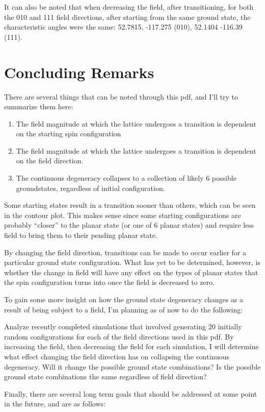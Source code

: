 \documentclass{article}
\begin{document}
\par It can also be noted that when decreasing the field, after transitioning, for both the 
010 and 111 field directions, after starting from the same ground state, the characteristic angles were the same: 52.7815, -117.275 (010), 52.1404 -116.39 (111).
\section{Concluding Remarks}
There are several things that can be noted through this pdf, and I'll try to summarize them here:
\begin{enumerate}
 \item The field magnitude at which the lattice undergoes a transition is dependent on the starting spin configuration
 \item The field magnitude at which the lattice undergoes a transition is dependent on the field direction.
 \item The continuous degeneracy collapses to a collection of likely 6 possible groundstates, regardless of initial configuration.
\end{enumerate}
\par Some starting states result in a transition sooner than others, which can be seen in the contour plot. This makes sense
since some starting configurations are probably ``closer'' to the planar state (or one of 6 planar states) and
require less field to bring them to their pending planar state. 
\par By changing the field direction, transitions can be made to occur earlier for a particular ground state configuration.
What has yet to be determined, however, is
whether the change in field will have any effect on the types of planar states that the spin configuration turns into
once the field is decreased to zero. 
\par To gain some more insight on how the ground state degeneracy changes as a result of being subject to a field, I'm planning as of now to do the following:
\par Analyze recently completed simulations that involved generating 20 initially random configurations for each
 of the field directions used in this pdf. By increasing the field, then decreasing the field for each simulation,
 I will determine what effect changing the field direction has on collapsing the continuous degeneracy. Will it change
 the possible ground state combinations? Is the possible ground state combinations the same regardless of field direction?
 \par Finally, there are several long term goals that should be addressed at some point in the future, and are as follows:
\end{document}
